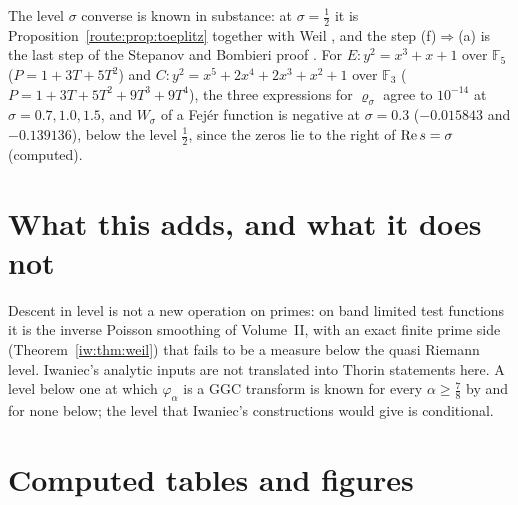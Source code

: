 The level $\sigma$ converse is known in substance: at $\sigma=\frac12$ it is Proposition~\ref{route:prop:toeplitz} together with Weil \cite{Weil52}, and the step (f)$\Rightarrow$(a) is the last step of the Stepanov and Bombieri proof \cite{BombieriStepanov}. For $E:y^2=x^3+x+1$ over $\mathbb F_5$ ($P=1+3T+5T^2$) and $C:y^2=x^5+2x^4+2x^3+x^2+1$ over $\mathbb F_3$ ($P=1+3T+5T^2+9T^3+9T^4$), the three expressions for $\varrho_\sigma$ agree to $10^{-14}$ at $\sigma=0.7,1.0,1.5$, and $W_\sigma$ of a Fej\'er function is negative at $\sigma=0.3$ ($-0.015843$ and $-0.139136$), below the level $\frac12$, since the zeros lie to the right of $\operatorname{Re} s=\sigma$ (computed).\section{What this adds, and what it does not}\label{iw:sec:adds}

Descent in level is not a new operation on primes: on band limited test functions it is the inverse Poisson smoothing of Volume~II, with an exact finite prime side (Theorem~\ref{iw:thm:weil}) that fails to be a measure below the quasi Riemann level. Iwaniec's analytic inputs are not translated into Thorin statements here. A level below one at which $\varphi_\alpha$ is a GGC transform is known for every $\alpha\ge\frac78$ by \cite{OAI26a} and for none below; the level that Iwaniec's constructions would give is conditional.

\section{Computed tables and figures}\label{iw:sec:numerics}

